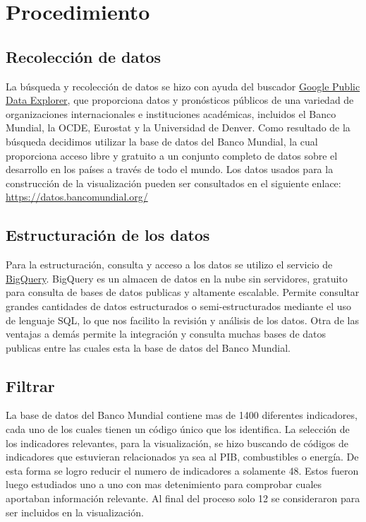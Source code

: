 \documentclass[spanish, letterpaper, 12 pt, conference]{ieeeconf}  %
\begin{document}
\section{Procedimiento}

\subsection{Recolección de datos}

La búsqueda y recolección de datos se hizo con ayuda del buscador \href{https://www.google.com/publicdata}{Google Public Data Explorer}, que proporciona datos y pronósticos públicos de una variedad de organizaciones internacionales e instituciones académicas, incluidos el Banco Mundial, la OCDE, Eurostat y la Universidad de Denver. 
Como resultado de la búsqueda decidimos utilizar la base de datos del Banco Mundial, la cual proporciona acceso libre y gratuito a un conjunto completo de datos sobre el desarrollo en los países a través de todo el mundo. Los datos usados para la construcción de la visualización pueden ser consultados en el siguiente enlace: \url{https://datos.bancomundial.org/} 

\subsection{Estructuración  de  los  datos}

Para la estructuración, consulta y acceso a los datos se utilizo el servicio de \href{https://cloud.google.com/products/bigquery/}{BigQuery}.
BigQuery es un almacen de datos en la nube sin servidores, gratuito para consulta de bases de datos publicas y altamente escalable. Permite consultar grandes cantidades de datos estructurados o semi-estructurados mediante el uso de lenguaje SQL, lo que nos facilito la revisión y análisis de los datos.  
Otra de las ventajas a demás permite la integración y consulta muchas bases de datos publicas entre las cuales esta la base de datos del Banco Mundial.

\subsection{Filtrar}

La base de datos del Banco Mundial contiene mas de 1400 diferentes indicadores, cada uno de los cuales tienen un código único que los identifica. La selección de los indicadores relevantes, para la visualización, se hizo buscando de códigos de indicadores que estuvieran relacionados ya sea al PIB, combustibles o energía. De esta forma se logro reducir el numero de indicadores a solamente 48. Estos fueron luego estudiados uno a uno con mas detenimiento para comprobar cuales aportaban información relevante. Al final del proceso solo 12 se consideraron para ser incluidos en la visualización.
\end{document}
